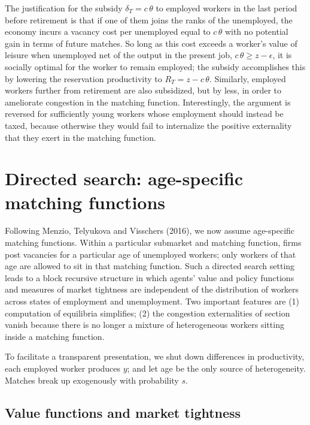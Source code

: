 The justification  for the subsidy $\delta_T=c\,\theta$ to employed workers
in the last period before retirement is that if one of them joins the
ranks of the unemployed, the economy incurs a vacancy cost per unemployed
equal to $c \, \theta$ with no potential gain in terms of future matches.
So long as this cost exceeds a worker's value of leisure when unemployed
net of the output in the present job, $c\,\theta \geq z - \epsilon$, it
is socially optimal for the worker to  remain employed; the subsidy accomplishes this
 by lowering the reservation productivity to
$R_T= z-c \, \theta$.
Similarly, employed workers further  from retirement  are also subsidized, but by less, in order to
ameliorate  congestion in the matching function. Interestingly, the argument is reversed for sufficiently young
workers whose employment should instead be taxed, because otherwise they would
 fail to internalize the positive externality that they
exert in the matching function.



%
\section{Directed search: age-specific matching functions}
\label{sec:OLG2}%
Following Menzio, Telyukova and Visschers (2016), we now
assume age-specific matching functions. Within a particular  submarket and
 matching function, firms post vacancies for a
particular age of  unemployed workers;  only workers of
that age  are allowed to sit in that  matching
function. Such a directed search setting leads to a
block recursive structure in which agents' value and policy
functions and measures of market tightness are independent of
the distribution of workers across states of employment and
unemployment. Two important features are
(1)  computation of equilibria simplifies;
(2)  the congestion externalities of section 
vanish because there is no longer a  mixture  of heterogeneous
workers sitting inside a matching function.

To facilitate a transparent presentation, we shut down differences in
productivity, each employed worker produces $y$;
and let age be the only source
of heterogeneity. Matches break up exogenously
with probability $s$.



\subsection{Value functions and market tightness}

